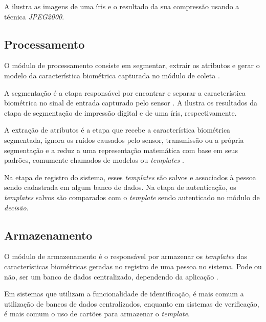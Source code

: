 \par A  ilustra as imagens de uma íris e o resultado da sua compressão usando a técnica \textit{JPEG2000}.


\subsection{Processamento}

\par O módulo de processamento consiste em segmentar, extrair os atributos e gerar o modelo da característica biométrica capturada no módulo de coleta \cite{wayman2005biometric}.

\par A segmentação é a etapa responsável por encontrar e separar a característica biométrica no sinal de entrada capturado pelo sensor \cite{wayman2005biometric}. A  ilustra os resultados da etapa de segmentação de impressão digital e de uma íris, respectivamente.


\par A extração de atributos é a etapa que recebe a característica biométrica segmentada, ignora os ruídos causados pelo sensor, transmissão ou a própria segmentação e a reduz a uma representação matemática com base em seus padrões, comumente chamados de modelos ou \textit{templates} \cite{wayman2005biometric}.

\par Na etapa de registro do sistema, esses \textit{templates} são salvos e associados à pessoa sendo cadastrada em algum banco de dados. Na etapa de autenticação, os \textit{templates} salvos são comparados com o \textit{template} sendo autenticado no módulo de \textit{decisão}.

\subsection{Armazenamento}

\par O módulo de armazenamento é o responsável por armazenar os \textit{templates} das características biométricas geradas no registro de uma pessoa no sistema. Pode ou não, ser um banco de dados centralizado, dependendo da aplicação \cite{wayman2005biometric}.

\par Em sistemas que utilizam a funcionalidade de identificação, é mais comum a utilização de bancos de dados centralizados, enquanto em sistemas de verificação, é mais comum o uso de cartões para armazenar o \textit{template}.

